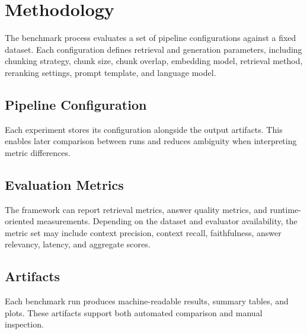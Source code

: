 \section{Methodology}

The benchmark process evaluates a set of pipeline configurations against a fixed dataset. Each configuration defines retrieval and generation parameters, including chunking strategy, chunk size, chunk overlap, embedding model, retrieval method, reranking settings, prompt template, and language model.

\subsection{Pipeline Configuration}

Each experiment stores its configuration alongside the output artifacts. This enables later comparison between runs and reduces ambiguity when interpreting metric differences.

\subsection{Evaluation Metrics}

The framework can report retrieval metrics, answer quality metrics, and runtime-oriented measurements. Depending on the dataset and evaluator availability, the metric set may include context precision, context recall, faithfulness, answer relevancy, latency, and aggregate scores.

\subsection{Artifacts}

Each benchmark run produces machine-readable results, summary tables, and plots. These artifacts support both automated comparison and manual inspection.
